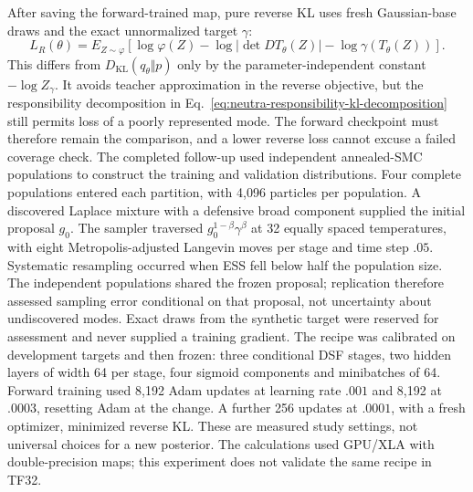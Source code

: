 After saving the forward-trained map, pure reverse KL uses fresh Gaussian-base
draws and the exact unnormalized target $\gamma$:
\begin{equation}
 L_R(\theta)=E_{Z\sim\varphi}\!\left[
    \log\varphi(Z)-\log|\det DT_\theta(Z)|
       -\log\gamma(T_\theta(Z))\right].
\end{equation}
This differs from $D_{\mathrm{KL}}(q_\theta\Vert p)$ only by the
parameter-independent constant $-\log Z_\gamma$. It avoids teacher approximation
in the reverse objective, but the responsibility decomposition in
Eq.~\eqref{eq:neutra-responsibility-kl-decomposition} still permits loss of a
poorly represented mode. The forward checkpoint must therefore remain the
comparison, and a lower reverse loss cannot excuse a failed coverage check.
The completed follow-up used independent annealed-SMC populations to construct
the training and validation distributions. Four complete populations entered
each partition, with 4,096 particles per population. A discovered Laplace
mixture with a defensive broad component supplied the initial proposal $g_0$.
The sampler traversed $g_0^{1-\beta}\gamma^\beta$ at 32 equally spaced
temperatures, with eight Metropolis-adjusted Langevin moves per stage and
time step $.05$. Systematic resampling occurred when ESS fell below half the
population size. The independent populations shared the frozen proposal;
replication therefore assessed sampling error conditional on that proposal,
not uncertainty about undiscovered modes. Exact draws from the synthetic target were reserved for
assessment and never supplied a training gradient. The recipe was calibrated
on development targets and then frozen: three conditional DSF stages, two
hidden layers of width 64 per stage, four sigmoid components and minibatches
of 64. Forward training used 8,192 Adam updates at learning rate $.001$ and
8,192 at $.0003$, resetting Adam at the change. A further 256 updates at
$.0001$, with a fresh optimizer, minimized reverse KL. These are measured
study settings, not universal choices for a new posterior. The calculations
used GPU/XLA with double-precision maps; this experiment does not validate
the same recipe in TF32.

